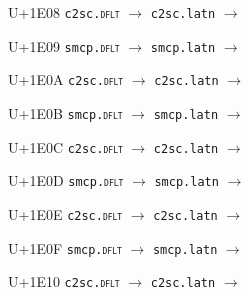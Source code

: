 \documentclass{article}
\begin{document}
\begin{substitutions}
\goodbreak

U+1E08  \linebreak
    \texttt{c2sc.\textsc{dflt}} $\to$  \linebreak
    \texttt{c2sc.latn} $\to$  

\goodbreak

U+1E09  \linebreak
    \texttt{smcp.\textsc{dflt}} $\to$  \linebreak
    \texttt{smcp.latn} $\to$  

\goodbreak

U+1E0A  \linebreak
    \texttt{c2sc.\textsc{dflt}} $\to$  \linebreak
    \texttt{c2sc.latn} $\to$  

\goodbreak

U+1E0B  \linebreak
    \texttt{smcp.\textsc{dflt}} $\to$  \linebreak
    \texttt{smcp.latn} $\to$  

\goodbreak

U+1E0C  \linebreak
    \texttt{c2sc.\textsc{dflt}} $\to$  \linebreak
    \texttt{c2sc.latn} $\to$  

\goodbreak

U+1E0D  \linebreak
    \texttt{smcp.\textsc{dflt}} $\to$  \linebreak
    \texttt{smcp.latn} $\to$  

\goodbreak

U+1E0E  \linebreak
    \texttt{c2sc.\textsc{dflt}} $\to$  \linebreak
    \texttt{c2sc.latn} $\to$  

\goodbreak

U+1E0F  \linebreak
    \texttt{smcp.\textsc{dflt}} $\to$  \linebreak
    \texttt{smcp.latn} $\to$  

\goodbreak

U+1E10  \linebreak
    \texttt{c2sc.\textsc{dflt}} $\to$  \linebreak
    \texttt{c2sc.latn} $\to$  


\end{substitutions}
\end{document}
